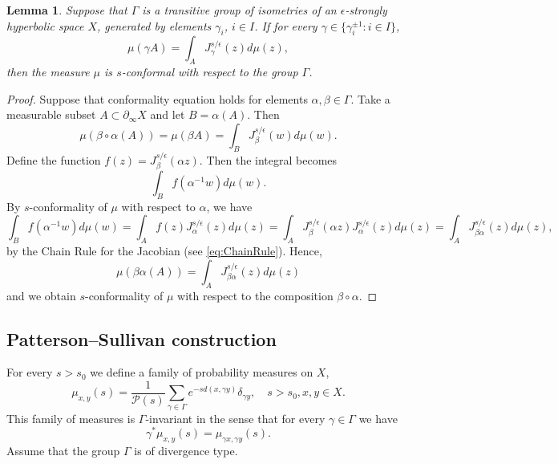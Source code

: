 \documentclass[12pt]{amsbook}%
\newtheorem{lem}[thm]{Lemma}
\theoremstyle{definition}
\theoremstyle{remark}
\numberwithin{section}{chapter}
\numberwithin{subsection}{section}
\numberwithin{figure}{chapter}
\def\eps{\epsilon}
\def\cP{{\mathscr{P}}}
\def\Ga{\Gamma}
\def\ga{\gamma}
\def\al{\alpha}
\def\geo{\partial_\infty}
\def\kap{}
\begin{document}
{{\begin{lem}\label{lem:generators}
Suppose that $\Ga$ is a transitive group of isometries of an $\eps$-strongly hyperbolic space $X$, 
generated by elements $\ga_i$, $i\in I$. If for every $\ga\in \{\ga^{\pm 1}_i: i\in I\}$,
$$
\mu(\ga A)=\int_A J^{s/\eps}_\ga(z)d\mu(z),
$$  
then the measure $\mu$ is $s$-conformal with respect to the group $\Ga$. 
\end{lem}
\begin{proof} Suppose that conformality equation holds for elements $\al, \beta\in \Ga$. Take a measurable subset $A\subset \geo X$ and let $B=\al(A)$. Then 
$$
\mu(\beta \circ \al(A))= \mu(\beta A)= \int_B J_{\beta}^{s/\eps}(w)d\mu(w). 
$$  
Define the function $f(z)=J^{s/\eps}_\beta(\al z)$. Then the integral becomes
$$
\int_B f(\al^{-1} w)d\mu(w). 
$$
By $s$-conformality of $\mu$ with respect to $\al$, we have
$$
\int_B f(\al^{-1} w)d\mu(w)= \int_{A} f(z)J^{s/\eps}_\al(z)d\mu(z)= \int_{A} J^{s/\eps}_{\beta}(\al z) J^{s/\eps}_\al(z)d\mu(z)= \int_A J^{s/\eps}_{\beta\al}(z)d\mu(z),
$$
by the Chain Rule for the Jacobian (see \eqref{eq:ChainRule}). Hence,
$$
\mu(\beta \al(A))= \int_A J^{s/\eps}_{\beta\al}(z)d\mu(z)
$$
and we obtain $s$-conformality of $\mu$ with respect to the composition $\beta\circ \al$. 
\end{proof}



\subsection{Patterson--Sullivan construction} 




For every $s>s_0$ we define a family of probability measures on $X$,%
 \begin{equation}
\mu_{x,y}(s) = \frac{1}{\cP(s)}\sum_{\gamma\in \Gamma}e^{-s d(x, \gamma y)}\delta_{\gamma y}, \quad s> s_0, x, y\in X.
 \end{equation}
This family of measures is $\Ga$-invariant in the sense that for every $\ga\in \Ga$ we have
$$
\ga^* \mu_{x,y}(s)= \mu_{\ga x, \ga y}(s). 
$$
Assume that the group $\Ga$ is of divergence type. 

}}
\end{document}
